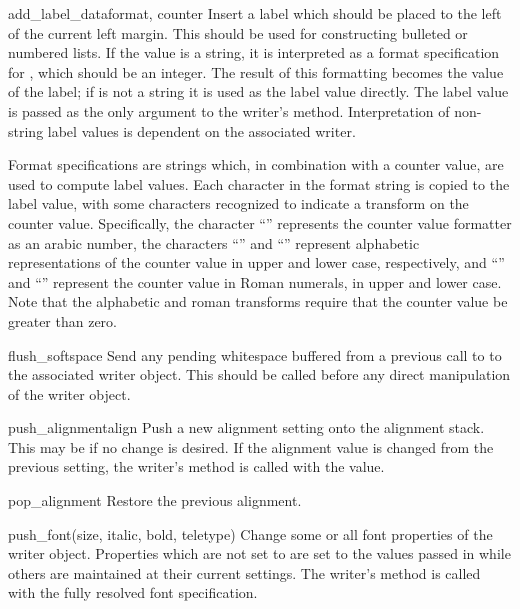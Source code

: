 \begin{funcdesc}{add_label_data}{format, counter}
Insert a label which should be placed to the left of the current left
margin.  This should be used for constructing bulleted or numbered
lists.  If the  value is a string, it is interpreted as a
format specification for , which should be an integer.
The result of this formatting becomes the value of the label; if
 is not a string it is used as the label value directly.
The label value is passed as the only argument to the writer's
 method.  Interpretation of non-string label
values is dependent on the associated writer.

Format specifications are strings which, in combination with a counter
value, are used to compute label values.  Each character in the format
string is copied to the label value, with some characters recognized
to indicate a transform on the counter value.  Specifically, the
character ``'' represents the counter value formatter as an
arabic number, the characters ``'' and ``'' represent
alphabetic representations of the counter value in upper and lower
case, respectively, and ``'' and ``'' represent the
counter value in Roman numerals, in upper and lower case.  Note that
the alphabetic and roman transforms require that the counter value be
greater than zero.
\end{funcdesc}

\begin{funcdesc}{flush_softspace}{}
Send any pending whitespace buffered from a previous call to
 to the associated writer object.  This
should be called before any direct manipulation of the writer object.
\end{funcdesc}

\begin{funcdesc}{push_alignment}{align}
Push a new alignment setting onto the alignment stack.  This may be
 if no change is desired.  If the alignment value is
changed from the previous setting, the writer's 
method is called with the  value.
\end{funcdesc}

\begin{funcdesc}{pop_alignment}{}
Restore the previous alignment.
\end{funcdesc}

\begin{funcdesc}{push_font}{(size, italic, bold, teletype)}
Change some or all font properties of the writer object.  Properties
which are not set to  are set to the values passed in
while others are maintained at their current settings.  The writer's
 method is called with the fully resolved font
specification.
\end{funcdesc}


